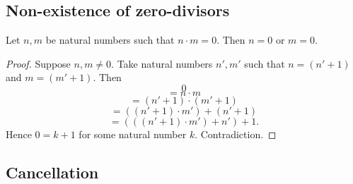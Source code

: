\documentclass[../arithmetic.tex]{subfiles}
\begin{document}
  \subsection*{Non-existence of zero-divisors}

  \begin{forthel}
    \begin{proposition}
      Let $n, m$ be natural numbers such that $n \cdot m = 0$.
      Then $n = 0$ or $m = 0$.
    \end{proposition}
    \begin{proof}
      Suppose $n, m \neq 0$.
      Take natural numbers $n', m'$ such that $n = (n' + 1)$ and $m = (m' + 1)$.
      Then
      \[  0                                     \]
      \[    = n \cdot m                         \]
      \[    = (n' + 1) \cdot (m' + 1)           \]
      \[    = ((n' + 1) \cdot m') + (n' + 1)    \]
      \[    = (((n' + 1) \cdot m') + n') + 1.   \]
      Hence $0 = k + 1$ for some natural number $k$.
      Contradiction.
    \end{proof}
  \end{forthel}


  \subsection*{Cancellation}
\end{document}

